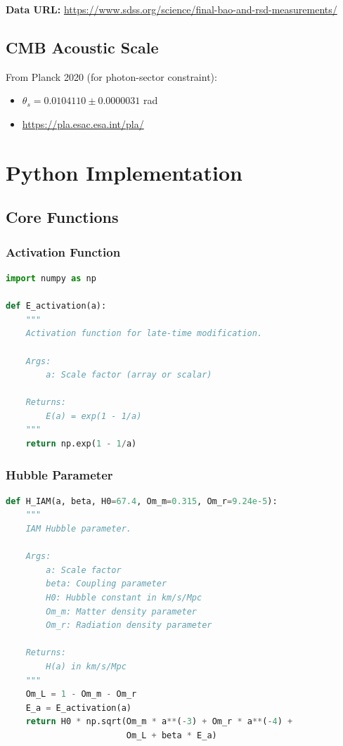 \documentclass[11pt]{article}
\begin{document}
\noindent\textbf{Data URL:} \url{https://www.sdss.org/science/final-bao-and-rsd-measurements/}

\subsection{CMB Acoustic Scale}

From Planck 2020 (for photon-sector constraint):
\begin{itemize}
    \item $\theta_s = 0.0104110 \pm 0.0000031$ rad
    \item \url{https://pla.esac.esa.int/pla/}
\end{itemize}

\section{Python Implementation}

\subsection{Core Functions}

\subsubsection{Activation Function}

\begin{lstlisting}[language=Python]
import numpy as np

def E_activation(a):
    """
    Activation function for late-time modification.
    
    Args:
        a: Scale factor (array or scalar)
    
    Returns:
        E(a) = exp(1 - 1/a)
    """
    return np.exp(1 - 1/a)
\end{lstlisting}

\subsubsection{Hubble Parameter}

\begin{lstlisting}[language=Python]
def H_IAM(a, beta, H0=67.4, Om_m=0.315, Om_r=9.24e-5):
    """
    IAM Hubble parameter.
    
    Args:
        a: Scale factor
        beta: Coupling parameter
        H0: Hubble constant in km/s/Mpc
        Om_m: Matter density parameter
        Om_r: Radiation density parameter
    
    Returns:
        H(a) in km/s/Mpc
    """
    Om_L = 1 - Om_m - Om_r
    E_a = E_activation(a)
    return H0 * np.sqrt(Om_m * a**(-3) + Om_r * a**(-4) + 
                        Om_L + beta * E_a)
\end{lstlisting}
\end{document}
